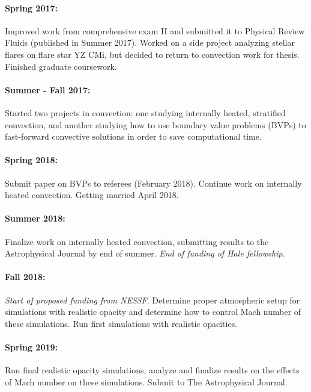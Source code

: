 \documentclass[aasms,12pt]{article}
\begin{document}
\vspace{-0.4cm}
\paragraph{Spring 2017:} Improved work from comprehensive exam II and submitted it to Physical
Review Fluids (published in Summer 2017).  Worked on a side project analyzing stellar flares
on flare star YZ CMi, but decided to return to convection work for thesis.  
Finished graduate coursework.

\vspace{-0.4cm}
\paragraph{Summer - Fall 2017:}  Started two projects in convection: one studying internally heated,
stratified convection, and another studying how to use boundary value problems (BVPs) to fast-forward
convective solutions in order to save computational time.

\vspace{-0.4cm}
\paragraph{Spring 2018:} Submit paper on BVPs to referees (February 2018).  Continue
work on internally heated convection.  Getting married April 2018.

\vspace{-0.4cm}
\paragraph{Summer 2018:}  Finalize work on internally heated convection, 
submitting results to the Astrophysical Journal by end of summer.  \emph{End of
funding of Hale fellowship}.

\vspace{-0.4cm}
\paragraph{Fall 2018:} \emph{Start of proposed funding from NESSF}. Determine proper
atmospheric setup for simulations with realistic opacity and determine how to control
Mach number of these simulations.  Run first simulations with realistic opacities.

\vspace{-0.4cm}
\paragraph{Spring 2019:} Run final realistic opacity simulations, analyze and finalize
results on the effects of Mach number on these simulations.  Submit to The Astrophysical Journal.
\end{document}
